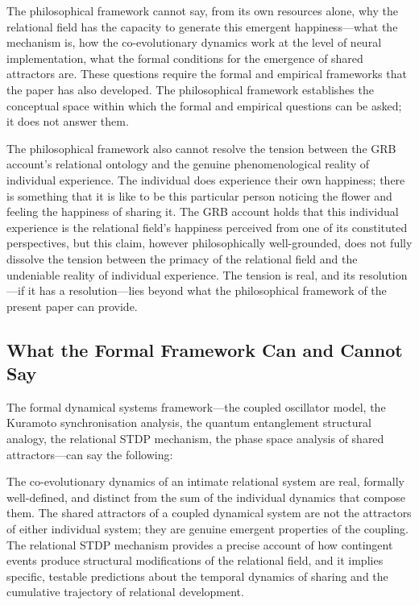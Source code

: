 The philosophical framework cannot say, from its own resources alone, why the relational field has the capacity to generate this emergent happiness---what the mechanism is, how the co-evolutionary dynamics work at the level of neural implementation, what the formal conditions for the emergence of shared attractors are. These questions require the formal and empirical frameworks that the paper has also developed. The philosophical framework establishes the conceptual space within which the formal and empirical questions can be asked; it does not answer them.

The philosophical framework also cannot resolve the tension between the GRB account's relational ontology and the genuine phenomenological reality of individual experience. The individual does experience their own happiness; there is something that it is like to be this particular person noticing the flower and feeling the happiness of sharing it. The GRB account holds that this individual experience is the relational field's happiness perceived from one of its constituted perspectives, but this claim, however philosophically well-grounded, does not fully dissolve the tension between the primacy of the relational field and the undeniable reality of individual experience. The tension is real, and its resolution---if it has a resolution---lies beyond what the philosophical framework of the present paper can provide.

\subsection{What the Formal Framework Can and Cannot Say}
\label{p14:subsec:conc_formal}

\noindent
The formal dynamical systems framework---the coupled oscillator model, the Kuramoto synchronisation analysis, the quantum entanglement structural analogy, the relational STDP mechanism, the phase space analysis of shared attractors---can say the following:

The co-evolutionary dynamics of an intimate relational system are real, formally well-defined, and distinct from the sum of the individual dynamics that compose them. The shared attractors of a coupled dynamical system are not the attractors of either individual system; they are genuine emergent properties of the coupling. The relational STDP mechanism provides a precise account of how contingent events produce structural modifications of the relational field, and it implies specific, testable predictions about the temporal dynamics of sharing and the cumulative trajectory of relational development.

